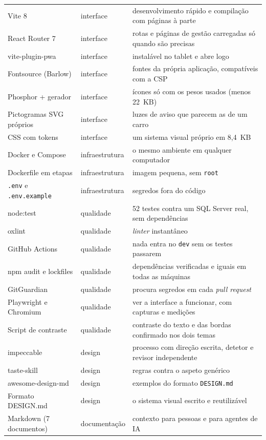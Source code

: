 \documentclass[a4paper,12pt]{article}
\begin{document}
\begin{xltabular}{\textwidth}{@{}>{\raggedright\arraybackslash}p{3.5cm}>{\raggedright\arraybackslash}p{2.8cm}L@{}}
Vite 8 & interface & desenvolvimento rápido e compilação com páginas à parte \\
React Router 7 & interface & rotas e páginas de gestão carregadas só quando são precisas \\
vite-plugin-pwa & interface & instalável no tablet e abre logo \\
Fontsource (Barlow) & interface & fontes da própria aplicação, compatíveis com a CSP \\
Phosphor + gerador & interface & ícones só com os pesos usados (menos 22~KB) \\
Pictogramas SVG próprios & interface & luzes de aviso que parecem as de um carro \\
CSS com tokens & interface & um sistema visual próprio em 8,4~KB \\
Docker e Compose & infraestrutura & o mesmo ambiente em qualquer computador \\
Dockerfile em etapas & infraestrutura & imagem pequena, sem \texttt{root} \\
\texttt{.env} e \texttt{.env.example} & infraestrutura & segredos fora do código \\
node:test & qualidade & 52 testes contra um SQL Server real, sem dependências \\
oxlint & qualidade & \textit{linter} instantâneo \\
GitHub Actions & qualidade & nada entra no \texttt{dev} sem os testes passarem \\
npm audit e lockfiles & qualidade & dependências verificadas e iguais em todas as máquinas \\
GitGuardian & qualidade & procura segredos em cada \textit{pull request} \\
Playwright e Chromium & qualidade & ver a interface a funcionar, com capturas e medições \\
Script de contraste & qualidade & contraste do texto e das bordas confirmado nos dois temas \\
impeccable & design & processo com direção escrita, detetor e revisor independente \\
taste-skill & design & regras contra o aspeto genérico \\
awesome-design-md & design & exemplos do formato \texttt{DESIGN.md} \\
Formato DESIGN.md & design & o sistema visual escrito e reutilizável \\
Markdown (7 documentos) & documentação & contexto para pessoas e para agentes de IA \\

\end{xltabular}
\end{document}
